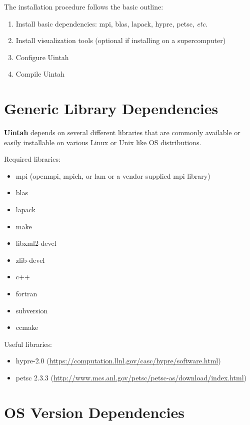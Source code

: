 \documentclass[12pt]{article}
\begin{document}
The installation procedure follows the basic outline:

\begin{enumerate}

\item Install basic dependencies: mpi, blas, lapack, hypre, petsc, \emph{etc}.

\item Install visualization tools (optional if installing on a supercomputer)

\item Configure Uintah

\item Compile Uintah


\end{enumerate}


\section{Generic Library Dependencies}

\textbf{Uintah} depends on several different libraries that are commonly
available or easily installable on various Linux or Unix like OS
distributions.  

Required libraries:
\begin{itemize}
\item mpi (openmpi, mpich, or lam or a vendor supplied mpi library)
\item blas
\item lapack
\item make
\item libxml2-devel
\item zlib-devel
\item c++
\item fortran
\item subversion
\item ccmake

\end{itemize}

Useful libraries:
\begin{itemize}
\item hypre-2.0 (\url{https://computation.llnl.gov/casc/hypre/software.html})
\item petsc 2.3.3 (\url{http://www.mcs.anl.gov/petsc/petsc-as/download/index.html})
\end{itemize}



\section{OS Version Dependencies}
\end{document}
